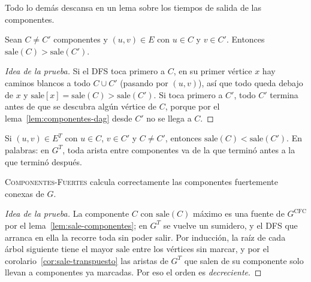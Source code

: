 \documentclass[11pt,letterpaper]{article}
\begin{document}
Todo lo demás descansa en un lema sobre los tiempos de salida de las
componentes.

\begin{lema}
  \label{lem:sale-componentes}
  Sean $C \neq C'$ componentes y $(u, v) \in E$ con $u \in C$ y
  $v \in C'$. Entonces $\text{sale}(C) > \text{sale}(C')$.
\end{lema}

\begin{proof}[Idea de la prueba]
  Si el DFS toca primero a $C$, en su primer vértice $x$ hay caminos
  blancos a todo $C \cup C'$ (pasando por $(u, v)$), así que todo queda
  debajo de $x$ y $\text{sale}[x] = \text{sale}(C) > \text{sale}(C')$.
  Si toca primero a $C'$, todo $C'$ termina antes de que se descubra
  algún vértice de $C$, porque por el lema~\ref{lem:componentes-dag}
  desde $C'$ no se llega a $C$.
\end{proof}

\begin{corolario}
  \label{cor:sale-transpuesto}
  Si $(u, v) \in E^T$ con $u \in C$, $v \in C'$ y $C \neq C'$,
  entonces $\text{sale}(C) < \text{sale}(C')$. En palabras: en $G^T$,
  toda arista entre componentes va de la que terminó antes a la que
  terminó después.
\end{corolario}

\begin{teorema}
  \label{teo:componentes-fuertes}
  {\upshape\textsc{Componentes-Fuertes}} calcula correctamente las
  componentes fuertemente conexas de $G$.
\end{teorema}

\begin{proof}[Idea de la prueba]
  La componente $C$ con $\text{sale}(C)$ máximo es una fuente de
  $G^{\text{CFC}}$ por el lema~\ref{lem:sale-componentes}; en $G^T$ se
  vuelve un sumidero, y el DFS que arranca en ella la recorre toda sin
  poder salir. Por inducción, la raíz de cada árbol siguiente tiene el
  mayor $\text{sale}$ entre los vértices sin marcar, y por el
  corolario~\ref{cor:sale-transpuesto} las aristas de $G^T$ que salen
  de su componente solo llevan a componentes ya marcadas. Por eso el
  orden es \emph{decreciente}.
\end{proof}
\end{document}
